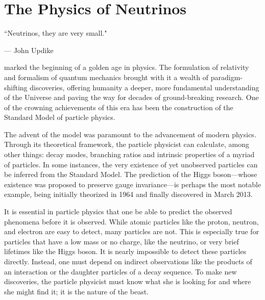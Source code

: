 %
%
%
%


\chapter{The Physics of Neutrinos}
	\label{neutrino_physics_chapter}

	\vspace{-0.2in}

	\begin{quoting}
		\noindent \large ``Neutrinos, they are very small." \normalsize

		--- John Updike
	\end{quoting}

	 marked the beginning of a golden age in physics. The formulation of relativity and formalism of quantum mechanics brought with it a wealth of paradigm-shifting discoveries, offering humanity a deeper, more fundamental understanding of the Universe and paving the way for decades of ground-breaking research. One of the crowning achievements of this era has been the construction of the Standard Model of particle physics.

	The advent of the model was paramount to the advancement of modern physics. Through its theoretical framework, the particle physicist can calculate, among other things: decay modes, branching ratios and intrinsic properties of a myriad of particles. In some instances, the very existence of yet unobserved particles can be inferred from the Standard Model. The prediction of the Higgs boson---whose existence was proposed to preserve gauge invariance---is perhaps the most notable example, being initially theorized in 1964 and finally discovered in March 2013.

	It is essential in particle physics that one be able to predict the observed phenomena before it is observed. While atomic particles like the proton, neutron, and electron are easy to detect, many particles are not. This is especially true for particles that have a low mass or no charge, like the neutrino, or very brief lifetimes like the Higgs boson. It is nearly impossible to detect these particles directly. Instead, one must depend on indirect observations like the products of an interaction or the daughter particles of a decay sequence. To make new discoveries, the particle physicist must know what she is looking for and where she might find it; it is the nature of the beast. 


